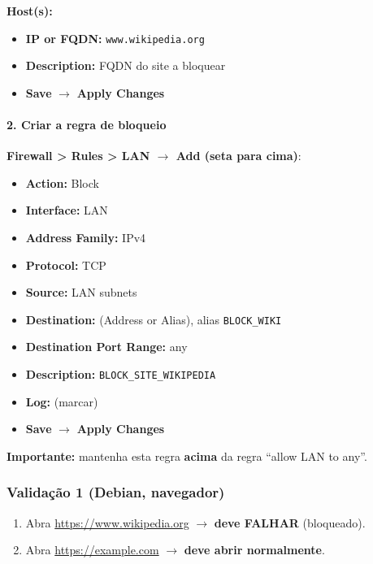 \textbf{Host(s):}
\begin{itemize}
  \item \textbf{IP or FQDN:} \texttt{www.wikipedia.org}
  \item \textbf{Description:} FQDN do site a bloquear
  \item \textbf{Save} $\rightarrow$ \textbf{Apply Changes}
\end{itemize}



\paragraph{2. Criar a regra de bloqueio} \textbf{Firewall > Rules > LAN $\rightarrow$ Add (seta para cima)}:

\begin{itemize}
  \item \textbf{Action:} Block
  \item \textbf{Interface:} LAN
  \item \textbf{Address Family:} IPv4
  \item \textbf{Protocol:} TCP
  \item \textbf{Source:} LAN subnets
  \item \textbf{Destination:} (Address or Alias), alias \texttt{BLOCK\_WIKI}
  \item \textbf{Destination Port Range:} any
  \item \textbf{Description:} \texttt{BLOCK\_SITE\_WIKIPEDIA}
  \item \textbf{Log:} (marcar)
  \item \textbf{Save} $\rightarrow$ \textbf{Apply Changes}
\end{itemize}


\begin{warnbox}
\textbf{Importante:} mantenha esta regra \textbf{acima} da regra ``allow LAN to any''.
\end{warnbox}

\subsubsection*{Validação 1 (Debian, navegador)}

\begin{enumerate}
\item Abra \url{https://www.wikipedia.org} $\rightarrow$ \textbf{deve FALHAR} (bloqueado).
\item Abra \url{https://example.com} $\rightarrow$ \textbf{deve abrir normalmente}.
\end{enumerate}

